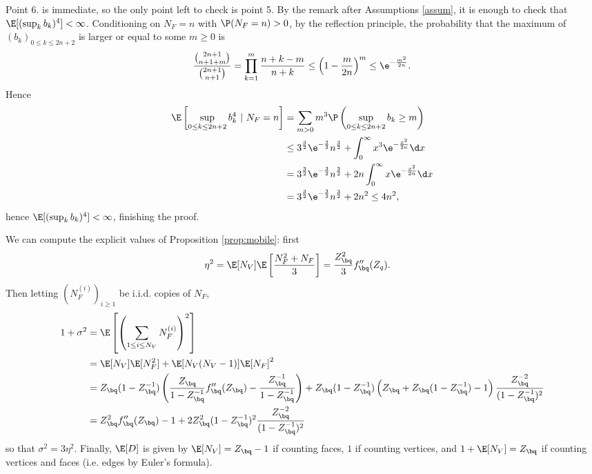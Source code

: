 \documentclass[10pt,a4paper]{article}
\begin{document}
Point 6. is immediate, so the only point left to check is point 5. By the remark after Assumptions \ref{assum}, it is enough to check that $\E[(\sup_k b_k)^4]<\infty$. 
Conditioning on $N_F=n$ with $\P(N_F=n)>0$, by the reflection principle, the probability that the maximum of $(b_k)_{0\leq k \leq 2n+2}$ is larger or equal to some $m\geq 0$ is
\[  \frac{ {{2n+1} \choose {n+1+m}} }{ {{2n+1} \choose {n+1}} } = \prod_{k=1}^m \frac{n+k-m}{n+k} \leq \left( 1 - \frac{m}{2n} \right)^m \leq \e^{-\frac{m^2}{2n}} . \]
Hence 
\begin{align*}
\E\left[ \sup_{0\leq k \leq 2n+2} b_k^4 \ | \ N_F = n \right] &= \sum_{m>0} m^3 \P\left( \sup_{0\leq k \leq 2n+2} b_k \geq m \right) \\
&\leq 3^{\frac{3}{2}}\e^{-\frac{3}{2}} n^{\frac{3}{2}} + \int_0^\infty x^3 \e^{-\frac{x^2}{2n}} \d x  \\
&= 3^{\frac{3}{2}}\e^{-\frac{3}{2}} n^{\frac{3}{2}} + 2n \int_0^\infty x \e^{-\frac{x^2}{2n}} \d x  \\
&= 3^{\frac{3}{2}}\e^{-\frac{3}{2}} n^{\frac{3}{2}} + 2n^2 \leq 4 n^2 ,
\end{align*}
hence $\E[(\sup_k b_k)^4]<\infty$, finishing the proof. 

We can compute the explicit values of Proposition \ref{prop:mobile}: first
\begin{align*}
\eta^2 &= \E[N_V] \E\left[\frac{N_F^2 + N_F}{3}\right] 
= \frac{Z_\bq^2}{3} f_\bq''(Z_q) .
\end{align*}
Then letting $(N_F^{(i)})_{i\geq 1}$ be i.i.d. copies of $N_F$, 
\begin{align*}
1+\sigma^2 &= \E\left[\left(\sum_{1\leq i\leq N_V} N_F^{(i)} \right)^2\right] \\
&= \E[N_V] \E[N_F^2] + \E[N_V(N_V-1)] \E[N_F]^2 \\
&= Z_\bq (1-Z_\bq^{-1}) \left( \frac{Z_\bq}{1-Z_\bq^{-1}} f''_\bq(Z_\bq) - \frac{Z_\bq^{-1}}{1-Z_\bq^{-1}} \right) + Z_\bq (1-Z_\bq^{-1}) \left( Z_\bq + Z_\bq (1-Z_\bq^{-1}) - 1 \right) \frac{Z_\bq^{-2}}{(1-Z_\bq^{-1})^2} \\
&= Z_\bq^2 f''_\bq(Z_\bq) - 1 + 2 Z_\bq^2 (1-Z_\bq^{-1})^2 \frac{Z_\bq^{-2}}{(1-Z_\bq^{-1})^2} 
\end{align*}
so that $\sigma^2 = 3\eta^2$. 
Finally, $\E[D]$ is given by $\E[N_V] = Z_\bq-1$ if counting faces, $1$ if counting vertices, and $1+\E[N_V] = Z_\bq$ if counting vertices and faces (i.e. edges by Euler's formula). 
\end{document}
